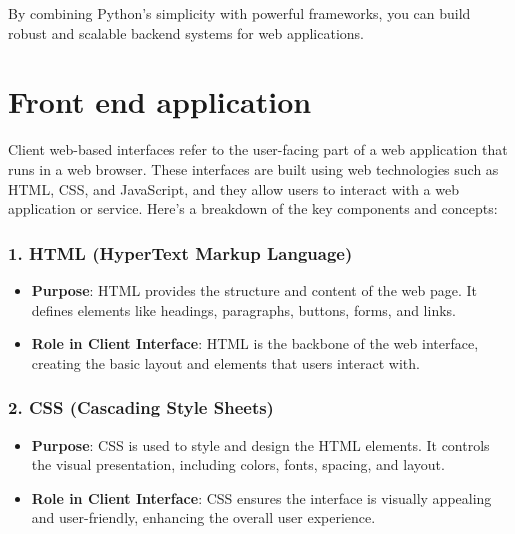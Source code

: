 \documentclass[11pt]{article}
\providecommand{\tightlist}{%
      \setlength{\itemsep}{0pt}\setlength{\parskip}{0pt}}
\begin{document}
By combining Python's simplicity with powerful frameworks, you can build
robust and scalable backend systems for web applications.

    \section{Front end application}\label{front-end-application}

Client web-based interfaces refer to the user-facing part of a web
application that runs in a web browser. These interfaces are built using
web technologies such as HTML, CSS, and JavaScript, and they allow users
to interact with a web application or service. Here's a breakdown of the
key components and concepts:

\subsubsection{\texorpdfstring{1. \textbf{HTML (HyperText Markup
Language)}}{1. HTML (HyperText Markup Language)}}\label{html-hypertext-markup-language}

\begin{itemize}
\tightlist
\item
  \textbf{Purpose}: HTML provides the structure and content of the web
  page. It defines elements like headings, paragraphs, buttons, forms,
  and links.
\item
  \textbf{Role in Client Interface}: HTML is the backbone of the web
  interface, creating the basic layout and elements that users interact
  with.
\end{itemize}

\subsubsection{\texorpdfstring{2. \textbf{CSS (Cascading Style
Sheets)}}{2. CSS (Cascading Style Sheets)}}\label{css-cascading-style-sheets}

\begin{itemize}
\tightlist
\item
  \textbf{Purpose}: CSS is used to style and design the HTML elements.
  It controls the visual presentation, including colors, fonts, spacing,
  and layout.
\item
  \textbf{Role in Client Interface}: CSS ensures the interface is
  visually appealing and user-friendly, enhancing the overall user
  experience.
\end{itemize}
\end{document}
